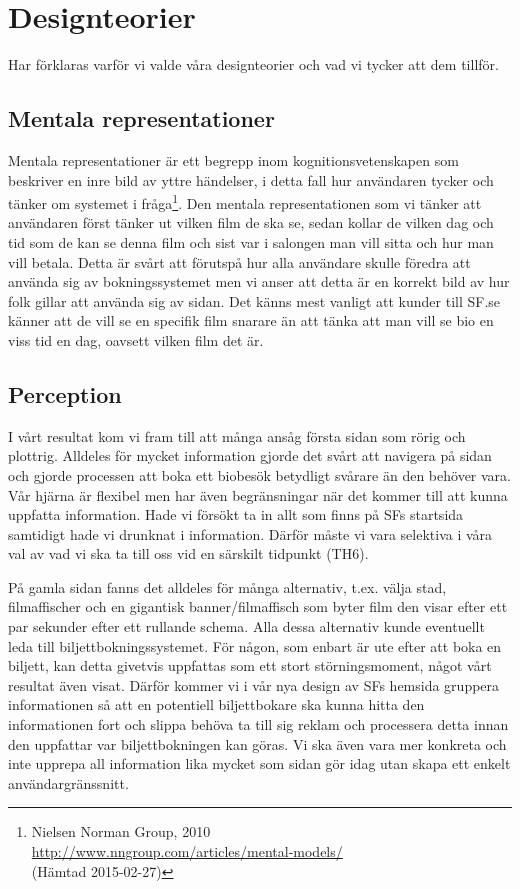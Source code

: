 \documentclass[swedish,a4paper,11pt]{article}
\begin{document}
\newpage
\section{Designteorier}
Har förklaras varför vi valde våra designteorier och vad vi tycker att dem tillför.

\subsection{Mentala representationer} 
Mentala representationer är ett begrepp inom kognitionsvetenskapen som beskriver en inre bild av yttre händelser, i detta fall hur användaren tycker och tänker om systemet i fråga\footnote{Nielsen Norman Group, 2010 \\ \url{http://www.nngroup.com/articles/mental-models/}\\ (Hämtad 2015-02-27)}. Den mentala representationen som vi tänker att användaren först tänker ut vilken film de ska se, sedan kollar de vilken dag och tid som de kan se denna film och sist var i salongen man vill sitta och hur man vill betala. Detta är svårt att förutspå hur alla användare skulle föredra att använda sig av bokningssystemet men vi anser att detta är en korrekt bild av hur folk gillar att använda sig av sidan. Det känns mest vanligt att kunder till SF.se känner att de vill se en specifik film snarare än att tänka att man vill se bio en viss tid en dag, oavsett vilken film det är.



\subsection{Perception} 
I vårt resultat kom vi fram till att många ansåg första sidan som rörig och plottrig. Alldeles för mycket information gjorde det svårt att navigera på sidan och gjorde processen att boka ett biobesök betydligt svårare än den behöver vara. Vår hjärna är flexibel men har även begränsningar när det kommer till att kunna uppfatta information. Hade vi försökt ta in allt som finns på SFs startsida samtidigt hade vi drunknat i information. Därför måste vi vara selektiva i våra val av vad vi ska ta till oss vid en särskilt tidpunkt (TH6).

På gamla sidan fanns det alldeles för många alternativ, t.ex. välja stad, filmaffischer och en gigantisk banner/filmaffisch som byter film den visar efter ett par sekunder efter ett rullande schema. Alla dessa alternativ kunde eventuellt leda till biljettbokningssystemet. För någon, som enbart är ute efter att boka en biljett, kan detta givetvis uppfattas som ett stort störningsmoment, något vårt resultat även visat. Därför kommer vi i vår nya design av SFs hemsida gruppera informationen så att en potentiell biljettbokare ska kunna hitta den informationen fort och slippa behöva ta till sig reklam och processera detta innan den uppfattar var biljettbokningen kan göras. Vi ska även vara mer konkreta och inte upprepa all information lika mycket som sidan gör idag utan skapa ett enkelt användargränssnitt.   
\end{document}
